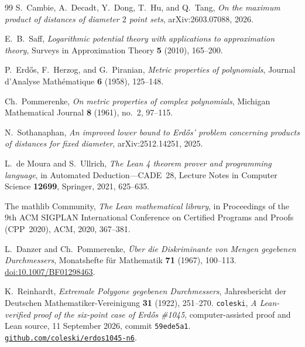 \documentclass[11pt,reqno]{amsart}
\numberwithin{equation}{section}
\theoremstyle{definition}
\theoremstyle{remark}
\begin{document}
\begin{thebibliography}{99}
S.~Cambie, A.~Decadt, Y.~Dong, T.~Hu, and Q.~Tang,
\emph{On the maximum product of distances of diameter $2$ point sets},
arXiv:2603.07088, 2026.

E.~B.~Saff, \emph{Logarithmic potential theory with applications to approximation theory},
Surveys in Approximation Theory \textbf{5} (2010), 165--200.

P.~Erd\H{o}s, F.~Herzog, and G.~Piranian,
\emph{Metric properties of polynomials},
Journal d'Analyse Math\'ematique \textbf{6} (1958), 125--148.

Ch.~Pommerenke, \emph{On metric properties of complex polynomials},
Michigan Mathematical Journal \textbf{8} (1961), no.~2, 97--115.

N.~Sothanaphan, \emph{An improved lower bound to Erd\H{o}s' problem concerning products of distances for fixed diameter},
arXiv:2512.14251, 2025.

L.~de Moura and S.~Ullrich,
\emph{The Lean 4 theorem prover and programming language},
in Automated Deduction---CADE~28,
Lecture Notes in Computer Science \textbf{12699}, Springer, 2021, 625--635.

The mathlib Community, \emph{The Lean mathematical library},
in Proceedings of the 9th ACM SIGPLAN International Conference on Certified Programs and Proofs (CPP~2020), ACM, 2020, 367--381.

L.~Danzer and Ch.~Pommerenke,
\emph{\"Uber die Diskriminante von Mengen gegebenen Durchmessers},
Monatshefte f\"ur Mathematik \textbf{71} (1967), 100--113.
\href{https://doi.org/10.1007/BF01298463}{doi:10.1007/BF01298463}.

K.~Reinhardt, \emph{Extremale Polygone gegebenen Durchmessers},
Jahresbericht der Deutschen Mathematiker-Vereinigung \textbf{31} (1922), 251--270.
\texttt{coleski}, \emph{A Lean-verified proof of the six-point case of Erd\H{o}s \#1045},
computer-assisted proof and Lean source, 11 September 2026,
commit \texttt{59ede5a1}.
\href{https://github.com/coleski/erdos1045-n6/tree/59ede5a12403d62d00fa21b59597dbb6c01fb0a2}{\texttt{github.com/coleski/erdos1045-n6}}.
\end{thebibliography}

\end{document}
